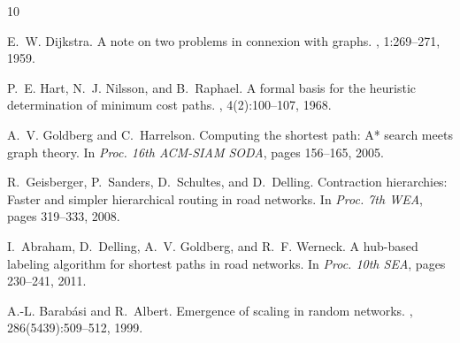 \documentclass[11pt,a4paper]{article}
\begin{document}

\begin{thebibliography}{10}

E.~W. Dijkstra.
\newblock A note on two problems in connexion with graphs.
, 1:269--271, 1959.

P.~E. Hart, N.~J. Nilsson, and B.~Raphael.
\newblock A formal basis for the heuristic determination of minimum cost paths.
, 
4(2):100--107, 1968.

A.~V. Goldberg and C.~Harrelson.
\newblock Computing the shortest path: A* search meets graph theory.
\newblock In {\em Proc. 16th ACM-SIAM SODA}, pages 156--165, 2005.

R.~Geisberger, P.~Sanders, D.~Schultes, and D.~Delling.
\newblock Contraction hierarchies: Faster and simpler hierarchical routing 
in road networks.
\newblock In {\em Proc. 7th WEA}, pages 319--333, 2008.

I.~Abraham, D.~Delling, A.~V. Goldberg, and R.~F. Werneck.
\newblock A hub-based labeling algorithm for shortest paths in road networks.
\newblock In {\em Proc. 10th SEA}, pages 230--241, 2011.

A.-L. Barabási and R.~Albert.
\newblock Emergence of scaling in random networks.
, 286(5439):509--512, 1999.

\end{thebibliography}
\end{document}
